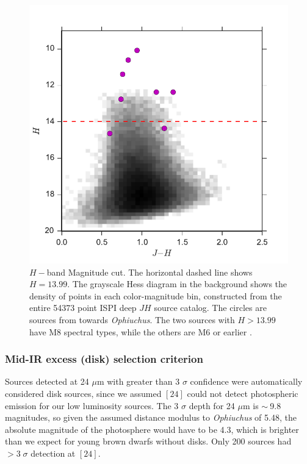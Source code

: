 \begin{figure}[ht!]
  \caption{$H-$band Magnitude cut.  The horizontal dashed line shows $H=13.99$.  The grayscale Hess diagram in the background shows the density of points in each color-magnitude bin, constructed from the entire 54373 point ISPI deep $JH$ source catalog.  The circles are sources from \citet{allers06} towards \emph{Ophiuchus}.  The two \citet{allers06} sources with $H>13.99$ have M8 spectral types, while the others are M6 or earlier \citep{2011ASPC..448..633G}. \label{fig_NIR_selection_H}}
\centering
\includegraphics[scale=0.6]{chIMACS/figures/NIR_selection_H_allers_oph}
\end{figure}


\subsubsection{Mid-IR excess (disk) selection criterion}
\label{sec_midIR_selection}
Sources detected at 24 $\mu$m with greater than 3 $\sigma$ confidence were automatically considered disk sources, since we assumed $[24]$ could not detect photospheric emission for our low luminosity sources.  The 3 $\sigma$ depth for 24 $\mu$m is $\sim~$9.8 magnitudes, so given the assumed distance modulus to \emph{Ophiuchus} of 5.48, the absolute magnitude of the photosphere would have to be 4.3, which is brighter than we expect for young brown dwarfs without disks.  Only 200 sources had $>3\;\sigma$ detection at $[24]$.

